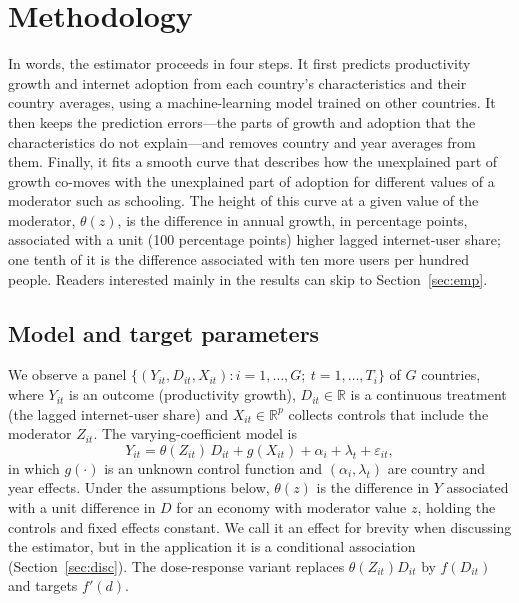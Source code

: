 \documentclass[preprint,12pt,authoryear]{elsarticle}
\begin{document}
\section{Methodology}\label{sec:method}

In words, the estimator proceeds in four steps. It first predicts productivity growth and internet adoption from each country's characteristics and their country averages, using a machine-learning model trained on other countries. It then keeps the prediction errors---the parts of growth and adoption that the characteristics do not explain---and removes country and year averages from them. Finally, it fits a smooth curve that describes how the unexplained part of growth co-moves with the unexplained part of adoption for different values of a moderator such as schooling. The height of this curve at a given value of the moderator, $\theta(z)$, is the difference in annual growth, in percentage points, associated with a unit (100 percentage points) higher lagged internet-user share; one tenth of it is the difference associated with ten more users per hundred people. Readers interested mainly in the results can skip to Section~\ref{sec:emp}.

\subsection{Model and target parameters}

We observe a panel $\{(Y_{it},D_{it},X_{it}) : i=1,\dots,G;\ t=1,\dots,T_i\}$ of $G$ countries, where $Y_{it}$ is an outcome (productivity growth), $D_{it}\in\mathbb{R}$ is a continuous treatment (the lagged internet-user share) and $X_{it}\in\mathbb{R}^p$ collects controls that include the moderator $Z_{it}$. The varying-coefficient model is
\begin{equation}
Y_{it} = \theta(Z_{it})\,D_{it} + g(X_{it}) + \alpha_i + \lambda_t + \varepsilon_{it},
\label{eq:model}
\end{equation}
in which $g(\cdot)$ is an unknown control function and $(\alpha_i,\lambda_t)$ are country and year effects. Under the assumptions below, $\theta(z)$ is the difference in $Y$ associated with a unit difference in $D$ for an economy with moderator value $z$, holding the controls and fixed effects constant. We call it an effect for brevity when discussing the estimator, but in the application it is a conditional association (Section~\ref{sec:disc}). The dose-response variant replaces $\theta(Z_{it})D_{it}$ by $f(D_{it})$ and targets $f'(d)$.
\end{document}
